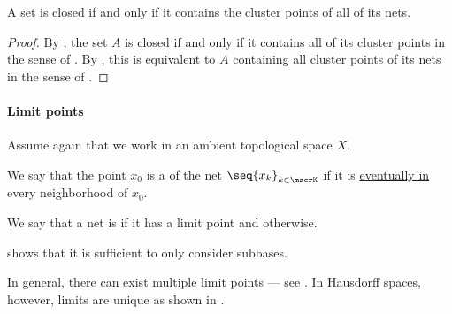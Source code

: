 \begin{corollary}\label{thm:closed_iff_contains_all_net_cluster_points}
  A set is closed if and only if it contains the cluster points of all of its nets.
\end{corollary}
\begin{proof}
  By , the set \( A \) is closed if and only if it contains all of its cluster points in the sense of . By , this is equivalent to \( A \) containing all cluster points of its nets in the sense of .
\end{proof}

\paragraph{Limit points}

Assume again that we work in an ambient topological space \( X \).

\begin{definition}\label{def:net_limit_point}
  We say that the point \( x_0 \) is a  of the net \( \seq{ x_k }_{k \in \mscrK} \) if it is \hyperref[def:net_eventually_in]{eventually in} every neighborhood of \( x_0 \).

  We say that a net is  if it has a limit point and  otherwise.
\end{definition}
\begin{comments}
  \item {} shows that it is sufficient to only consider subbases.

  \item In general, there can exist multiple limit points --- see . In Hausdorff spaces, however, limits are unique as shown in .
\end{comments}

